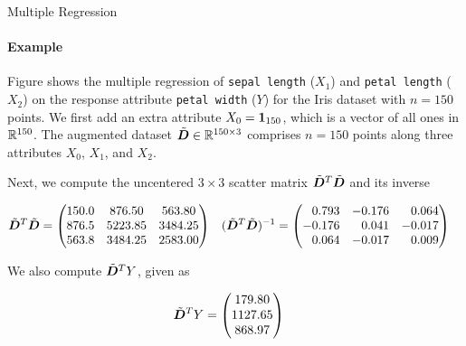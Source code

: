 \begin{frame}{Multiple Regression}
\framesubtitle{Example}
    \label{ex:reg:linear:multiple}
Figure shows the multiple regression of 
{\tt sepal length} ($X_1$) and {\tt petal
    length} ($X_2$) on the response attribute {\tt petal width} ($Y$)
for the Iris dataset with $n=150$ points. 
We first add an extra attribute $X_0 = \mathbf{1}_{150}$, which is a vector
of all ones in ${\mathord{\mathbb R}}^{150}$. The augmented dataset $\tilde{{\boldsymbol D}} \in
{\mathord{\mathbb R}}^{150\times 3}$ comprises $n=150$ points along
three attributes $X_0$, $X_1$, and $X_2$.

\medskip

Next, we compute the uncentered $3 \times 3$ scatter matrix
$\tilde{{\boldsymbol D}}^T\tilde{{\boldsymbol D}}$ and its inverse
\begin{small}
\begin{align*}
    \abD^T\abD & = \matr{
150.0 & 876.50  & 563.80\\
876.5 & 5223.85 & 3484.25\\
563.8 & 3484.25 & 2583.00 }
&
(\abD^T\abD)^{-1} & = \amatr{r}{
0.793 & -0.176 & 0.064\\
-0.176 &  0.041 & -0.017\\
0.064 & -0.017 &  0.009}
\end{align*}
\end{small}
We also compute $\tilde{{\boldsymbol D}}^T Y$, given as
\begin{small}
\begin{align*}
    \tilde{{\boldsymbol D}}^TY & = \begin{pmatrix} 
 179.80\\
 1127.65\\
 868.97 \end{pmatrix}
\end{align*}
\end{small}
\end{frame}

